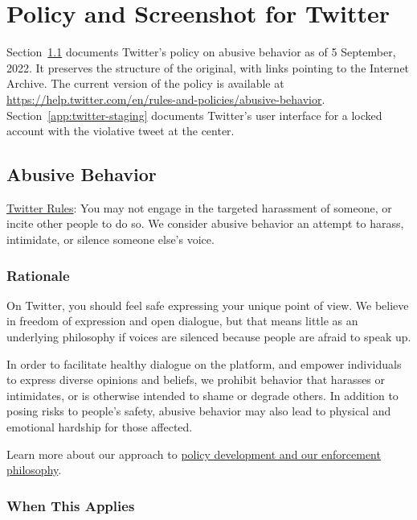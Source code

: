 \section{Policy and Screenshot for Twitter}
\label{app:twitter-sources}

Section~\ref{app:twitter-abusive-behavior} documents Twitter's policy on abusive
behavior as of 5 September, 2022. It preserves the structure of the original,
with links pointing to the Internet Archive. The current version of the policy
is available at
\url{https://help.twitter.com/en/rules-and-policies/abusive-behavior}.
Section~\ref{app:twitter-staging} documents Twitter's user interface for a
locked account with the violative tweet at the center.


\subsection{Abusive Behavior}
\label{app:twitter-abusive-behavior}

\noindent\href{https://web.archive.org/web/20220905021323/https://help.twitter.com/en/rules-and-policies/twitter-rules.html}{Twitter
Rules}: You may not engage in the targeted harassment of someone, or incite
other people to do so. We consider abusive behavior an attempt to harass,
intimidate, or silence someone else's voice.


\subsubsection{Rationale}

On Twitter, you should feel safe expressing your unique point of view. We
believe in freedom of expression and open dialogue, but that means little as an
underlying philosophy if voices are silenced because people are afraid to speak
up.

In order to facilitate healthy dialogue on the platform, and empower individuals
to express diverse opinions and beliefs, we prohibit behavior that harasses or
intimidates, or is otherwise intended to shame or degrade others. In addition to
posing risks to people's safety, abusive behavior may also lead to physical and
emotional hardship for those affected.

Learn more about our approach to
\href{https://web.archive.org/web/20220905021323/https://help.twitter.com/en/rules-and-policies/enforcement-philosophy.html}{policy
development and our enforcement philosophy}.


\subsubsection{When This Applies}

